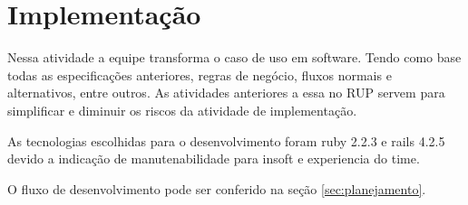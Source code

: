\section{Implementação}

Nessa atividade a equipe transforma o caso de uso em software. Tendo como base todas as especificações anteriores, regras de negócio, fluxos normais e alternativos, entre outros. As atividades anteriores a essa no RUP servem para simplificar e diminuir os riscos da atividade de implementação.

As tecnologias escolhidas para o desenvolvimento foram ruby 2.2.3 e rails 4.2.5 devido a indicação de manutenabilidade para insoft e experiencia do time.

O fluxo de desenvolvimento pode ser conferido na seção \ref{sec:planejamento}.
